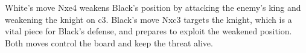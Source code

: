 White's move Nxe4 weakens Black's position by attacking the enemy's king and weakening the knight on c3. Black's move Nxc3 targets the knight, which is a vital piece for Black's defense, and prepares to exploit the weakened position. Both moves control the board and keep the threat alive.
